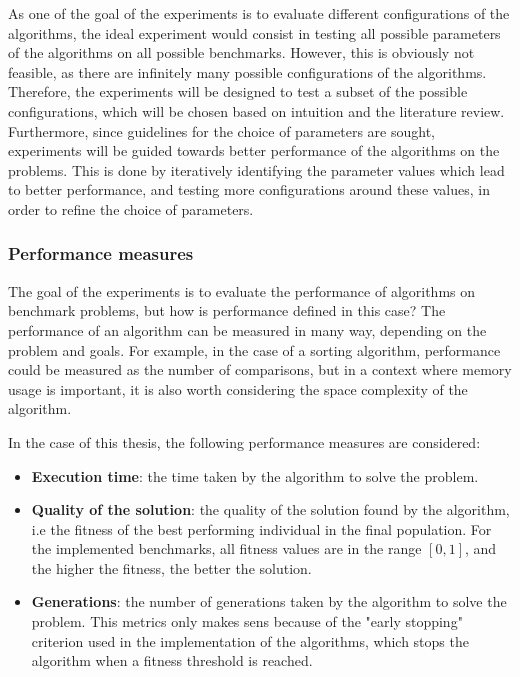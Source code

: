 As one of the goal of the experiments is to evaluate different configurations of the algorithms, the ideal experiment would consist in testing all possible parameters of the algorithms on all possible benchmarks.
However, this is obviously not feasible, as there are infinitely many possible configurations of the algorithms. Therefore, the experiments will be designed to test a subset of the possible configurations, which
will be chosen based on intuition and the literature review. Furthermore, since guidelines for the choice of parameters are sought, experiments will be guided towards
better performance of the algorithms on the problems. This is done by iteratively identifying the parameter values which lead to better performance, and testing more configurations around these values, in order
to refine the choice of parameters.

\subsubsection{Performance measures}

The goal of the experiments is to evaluate the performance of algorithms on benchmark problems, but how is performance defined in this case? The performance of an algorithm can be measured in many way,
depending on the problem and goals. For example, in the case of a sorting algorithm, performance could be measured as the number of comparisons, but in a context where memory usage is important, it is also
worth considering the space complexity of the algorithm.

In the case of this thesis, the following performance measures are considered:

\begin{itemize}
    \item \textbf{Execution time}: the time taken by the algorithm to solve the problem.
    \item \textbf{Quality of the solution}: the quality of the solution found by the algorithm, i.e the fitness of the best performing individual in the final population. For the implemented benchmarks, all
    fitness values are in the range $[0, 1]$, and the higher the fitness, the better the solution.
    \item \textbf{Generations}: the number of generations taken by the algorithm to solve the problem. This metrics only makes sens because of the "early stopping" criterion used in the implementation of the
    algorithms, which stops the algorithm when a fitness threshold is reached.
\end{itemize}

